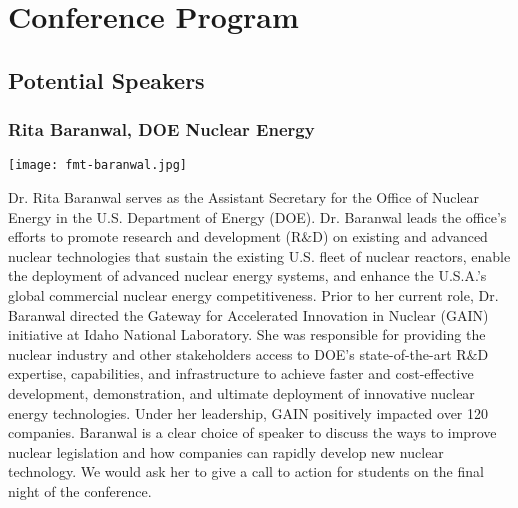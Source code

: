  \section{Conference Program}

\subsection{Potential Speakers}

\subsubsection{Rita Baranwal, DOE Nuclear Energy}

\begin{minipage}{0.25\textwidth}
	\centering
	\texttt{[image: fmt-baranwal.jpg]}
\end{minipage}
\begin{minipage}{0.73\textwidth}
	Dr. Rita Baranwal serves as the Assistant Secretary for the Office of Nuclear Energy in the U.S. Department of Energy (DOE).  Dr. Baranwal leads the office’s efforts to promote research and development (R$\&$D) on existing and advanced nuclear technologies that sustain the existing U.S. fleet of nuclear reactors, enable the deployment of advanced nuclear energy systems, and enhance the U.S.A.'s global commercial nuclear energy competitiveness. Prior to her current role, Dr. Baranwal directed the Gateway for Accelerated Innovation in Nuclear (GAIN) initiative at Idaho National Laboratory.  She was responsible for providing the nuclear industry and other stakeholders access to DOE's state-of-the-art R$\&$D expertise, capabilities, and infrastructure to achieve faster and cost-effective development, demonstration, and ultimate deployment of innovative nuclear energy technologies. Under her leadership, GAIN positively impacted over 120 companies. Baranwal is a clear choice of speaker to discuss the ways to improve nuclear legislation and how companies can rapidly develop new nuclear technology. We would ask her to give a call to action for students on the final night of the conference.
\end{minipage}

